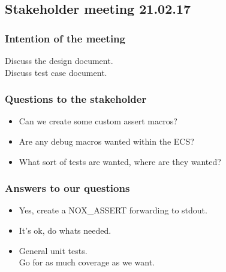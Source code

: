 \documentclass{article}
\begin{document}
\begin{center}
\subsection*{Stakeholder meeting 21.02.17}
\end{center}

\bigskip


\subsubsection*{Intention of the meeting}
Discuss the design document.\\
Discuss test case document.

\subsubsection*{Questions to the stakeholder}
\begin{itemize}
    \item 
    Can we create some custom assert macros?

    \item
    Are any debug macros wanted within the ECS?

    \item
    What sort of tests are wanted, where are they wanted?

\end{itemize}


\subsubsection*{Answers to our questions}
\begin{itemize}
    \item
    Yes, create a NOX\_ASSERT forwarding to stdout.
    
    \item 
    It's ok, do whats needed.
    
    \item 
    General unit tests.\\
    Go for as much coverage as we want.

\end{itemize}
\end{document}
